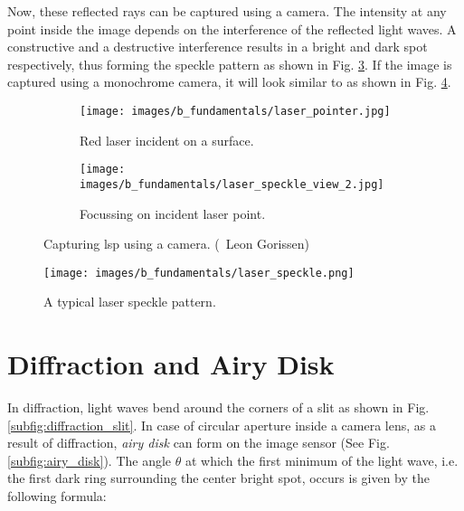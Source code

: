     \noindent Now, these reflected rays can be captured using a camera. The intensity at any point inside the image depends on the interference of the reflected light waves. A constructive and a destructive interference results in a bright and dark spot respectively, thus forming the speckle pattern as shown in Fig. \ref{fig:img_leon}. If the image is captured using a monochrome camera, it will look similar to as shown in Fig. \ref{fig:laser_speckle.jpg}.

    \begin{figure}[h]
        \begin{subfigure}{0.5\textwidth}
            \centering
            \texttt{[image: images/b\_fundamentals/laser\_pointer.jpg]}
            \caption{Red laser incident on a surface.}
            \label{subfig:laser_pointer.jpg}
        \end{subfigure}
        \begin{subfigure}{0.5\textwidth}
            \centering
            \texttt{[image: images/b\_fundamentals/laser\_speckle\_view\_2.jpg]}
            \caption{Focussing on incident laser point.}
            \label{subfig:laser_speckle_view_2.jpg}
        \end{subfigure}
        \caption{Capturing \gls{lsp} using a camera. (\textcopyright \ Leon Gorissen) \cite{img_gorissen}}
        \label{fig:img_leon}
    \end{figure}
    
    \begin{figure}[h]
        \centering
        \texttt{[image: images/b\_fundamentals/laser\_speckle.png]}
        \caption{A typical laser speckle pattern.}
        \label{fig:laser_speckle.jpg}
    \end{figure}

    \section*{Diffraction and Airy Disk}\label{Section:Diffraction}

    In diffraction, light waves bend around the corners of a slit as shown in Fig. \ref{subfig:diffraction_slit}. In case of circular aperture inside a camera lens, as a result of diffraction, \emph{airy disk} can form on the image sensor (See Fig. \ref{subfig:airy_disk}). The angle $\theta$ at which the first minimum of the light wave, i.e. the first dark ring surrounding the center bright spot, occurs is given by the following formula:

